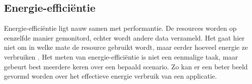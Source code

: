 \subsection{Energie-efficiëntie}
Energie-efficiëntie ligt nauw samen met performantie. De resources worden op eenzelfde manier gemonitord, echter wordt andere data verzameld. Het gaat hier niet om in welke mate de resource gebruikt wordt, maar eerder hoeveel energie ze verbruiken \autocite{Kor2015}. Het meten van energie-efficiëntie is niet een eenmalige taak, maar gebeurt best meerdere keren over een bepaald scenario. Zo kan er een beter beeld gevormd worden over het effectieve energie verbruik van een applicatie.


%
%
%
%



